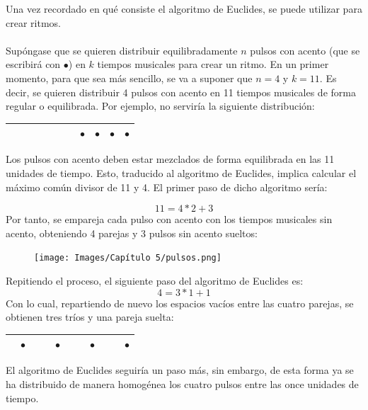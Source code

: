 \documentclass[a4paper, openright, 11pt, titlepage]{report}
\theoremstyle{definition}\newtheorem{defin}[propo]{Definition}
\theoremstyle{definition}\newtheorem{obser}[propo]{Remark}
\theoremstyle{definition}\newtheorem{ejem}[propo]{Ejemplo}
\theoremstyle{definition}\newtheorem{algoritmo}[propo]{Algoritmo}
\begin{document}
Una vez recordado en qué consiste el algoritmo de Euclides, se puede utilizar para crear ritmos.\\\\
Supóngase que se quieren distribuir equilibradamente $n$ pulsos con acento (que se escribirá con $\bullet$) en $k$ tiempos musicales para crear un ritmo. En un primer momento, para que sea más sencillo, se va a suponer que $n = 4$ y $k = 11$. Es decir, se quieren distribuir 4 pulsos con acento en 11 tiempos musicales de forma regular o equilibrada. Por ejemplo, no serviría la siguiente distribución:
\begin{table}[H]
    \centering
    \begin{tabular}{|c|c|c|c|c|c|c|c|c|c|c|}
    \hline
         & & & & & & & $\bullet$ & $\bullet$ & $\bullet$ & $\bullet$ \\
        \hline
    \end{tabular}
\end{table}
Los pulsos con acento deben estar mezclados de forma equilibrada en las 11 unidades de tiempo. Esto, traducido al algoritmo de Euclides, implica calcular el máximo común divisor de 11 y 4. El primer paso de dicho algoritmo sería:

$$11 = \boxed{4}*2 + \boxed{3}$$
Por tanto, se empareja cada pulso con acento con los tiempos musicales sin acento, obteniendo 4 parejas y 3 pulsos sin acento sueltos:
\begin{figure}[H]
    \centering
    \texttt{[image: Images/Capítulo 5/pulsos.png]}
\end{figure}
Repitiendo el proceso, el siguiente paso del algoritmo de Euclides es:
$$4 = \boxed{3}*1 + \boxed{1}$$
Con lo cual, repartiendo de nuevo los espacios vacíos entre las cuatro parejas, se obtienen tres tríos y una pareja suelta:
\begin{table}[H]
    \centering
    \begin{tabular}{|c|c|c|c|c|c|c|c|c|c|c|}
    \hline
         & $\bullet$ & & & $\bullet$ & & &$\bullet$ & & &$\bullet$\\
        \hline
    \end{tabular}
\end{table}
El algoritmo de Euclides seguiría un paso más, sin embargo, de esta forma ya se ha distribuido de manera homogénea los cuatro pulsos entre las once unidades de tiempo.\\\\
\end{document}
